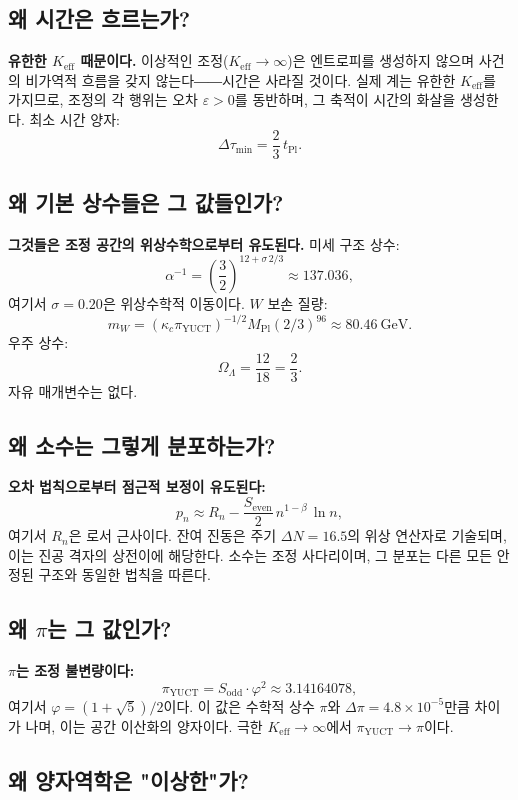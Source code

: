 \documentclass[12pt,a4paper]{article}
\newcommand{\Keff}{K_{\mathrm{eff}}}
\newcommand{\kappac}{\kappa_c}
\newcommand{\eps}{\varepsilon}
\newcommand{\betaf}{\beta}
\newcommand{\Sodd}{S_{\mathrm{odd}}}
\newcommand{\Seven}{S_{\mathrm{even}}}
\newcommand{\tPl}{t_{\mathrm{Pl}}}
\newcommand{\piYUCT}{\pi_{\mathrm{YUCT}}}
\begin{document}
	\subsection{왜 시간은 흐르는가?}
	
	\textbf{유한한 \(\Keff\) 때문이다.} 이상적인 조정(\(\Keff \to \infty\))은 엔트로피를 생성하지 않으며 사건의 비가역적 흐름을 갖지 않는다――시간은 사라질 것이다. 실제 계는 유한한 \(\Keff\)를 가지므로, 조정의 각 행위는 오차 \(\eps > 0\)를 동반하며, 그 축적이 시간의 화살을 생성한다. 최소 시간 양자:
	\[
	\Delta \tau_{\min} = \frac{2}{3}\,\tPl.
	\]
	
	\subsection{왜 기본 상수들은 그 값들인가?}
	
	\textbf{그것들은 조정 공간의 위상수학으로부터 유도된다.} 미세 구조 상수:
	\[
	\alpha^{-1} = \left(\frac{3}{2}\right)^{12 + \sigma\,2/3} \approx 137.036,
	\]
	여기서 \(\sigma = 0.20\)은 위상수학적 이동이다. \(W\) 보손 질량:
	\[
	m_W = (\kappac \piYUCT)^{-1/2} M_{\mathrm{Pl}} (2/3)^{96} \approx 80.46\ \text{GeV}.
	\]
	우주 상수:
	\[
	\Omega_\Lambda = \frac{12}{18} = \frac{2}{3}.
	\]
	자유 매개변수는 없다.
	
	\subsection{왜 소수는 그렇게 분포하는가?}
	
	\textbf{오차 법칙으로부터 점근적 보정이 유도된다:}
	\[
	p_n \approx R_n - \frac{\Seven}{2}\, n^{1-\betaf}\,\ln n,
	\]
	여기서 \(R_n\)은 로서 근사이다. 잔여 진동은 주기 \(\Delta N = 16.5\)의 위상 연산자로 기술되며, 이는 진공 격자의 상전이에 해당한다. 소수는 조정 사다리이며, 그 분포는 다른 모든 안정된 구조와 동일한 법칙을 따른다.
	
	\subsection{왜 \(\pi\)는 그 값인가?}
	
	\textbf{\(\pi\)는 조정 불변량이다:}
	\[
	\piYUCT = \Sodd \cdot \varphi^2 \approx 3.14164078,
	\]
	여기서 \(\varphi = (1+\sqrt{5})/2\)이다. 이 값은 수학적 상수 \(\pi\)와 \(\Delta\pi = 4.8\times10^{-5}\)만큼 차이가 나며, 이는 공간 이산화의 양자이다. 극한 \(\Keff \to \infty\)에서 \(\piYUCT \to \pi\)이다.
	
	\subsection{왜 양자역학은 "이상한"가?}
	
\end{document}
